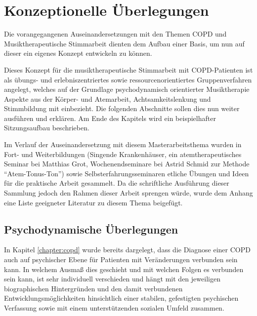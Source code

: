 \ifpdf
    \graphicspath{{4_konzept/figures/PNG/}{4_konzept/figures/PDF/}{4_konzept/figures/}}
\else
    \graphicspath{{4_konzept/figures/EPS/}{4_konzept/figures/}}
\fi

\chapter{Konzeptionelle Überlegungen}
\label{chapter:konzeptionelle_ueberlegungen}
Die vorangegangenen Auseinandersetzungen mit den Themen COPD und Musiktherapeutische Stimmarbeit dienten dem Aufbau einer Basis, um nun auf dieser ein eigenes Konzept entwickeln zu können. 

Dieses Konzept für die musiktherapeutische Stimmarbeit mit COPD-Patienten ist als übungs- und erlebniszentriertes sowie ressourcenorientiertes Gruppenverfahren angelegt, welches auf der Grundlage psychodynamisch orientierter Musiktherapie Aspekte aus der Körper- und Atemarbeit, Achtsamkeitslenkung und Stimmbildung mit einbezieht. Die folgenden Abschnitte sollen dies nun weiter ausführen und erklären. Am Ende des Kapitels wird ein beispielhafter Sitzungsaufbau beschrieben. %

Im Verlauf der Auseinandersetzung mit diesem Masterarbeitsthema wurden in Fort- und Weiterbildungen (Singende Krankenhäuser, ein atemtherapeutisches Seminar bei Matthias Grot, Wochenendseminare bei Astrid Schmid zur Methode "`Atem-Tonus-Ton"') sowie Selbsterfahrungsseminaren etliche Übungen und Ideen für die praktische Arbeit gesammelt. Da die schriftliche Ausführung dieser Sammlung jedoch den Rahmen dieser Arbeit sprengen würde, wurde dem Anhang eine Liste geeigneter Literatur zu diesem Thema beigefügt.

\section{Psychodynamische Überlegungen}
\label{psychodynamische_ueberlegungen}
In Kapitel \ref{chapter:copd} wurde bereits dargelegt, dass die Diagnose einer COPD auch auf psychischer Ebene für Patienten mit Veränderungen verbunden sein kann. In welchem Ausmaß dies geschieht und mit welchen Folgen es verbunden sein kann, ist sehr individuell verschieden und hängt mit den jeweiligen biographischen Hintergründen und den damit verbundenen Entwicklungsmöglichkeiten hinsichtlich einer stabilen, gefestigten psychischen Verfassung sowie mit einem unterstützenden sozialen Umfeld zusammen. 

